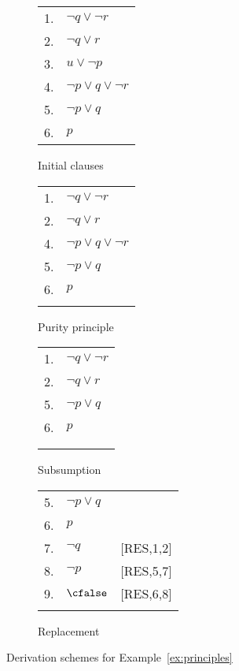 \begin{example}
    \begin{figure}
        \centering
       \begin{subfigure}{.20\textwidth}
           \caption{Initial clauses}
           \begin{tabular}{rl}
               1. & $\neg q \lor \neg r$ \\
               2. & $\neg q \lor r$ \\
               3. & $u \lor \neg p$ \\
               4. & $\neg p \lor q \lor \neg r$ \\
               5. & $\neg p \lor q$ \\
               6. & $p$
           \end{tabular}%
           \label{tab:resa}
       \end{subfigure} 
       \begin{subfigure}{.21\textwidth}
           \caption{Purity principle}
           \begin{tabular}{rl}
               1. & $\neg q \lor \neg r$ \\
               2. & $\neg q \lor r$ \\
               4. & $\neg p \lor q \lor \neg r$ \\
               5. & $\neg p \lor q$ \\
               6. & $p$ \\
                  & 
           \end{tabular}%
           \label{tab:resb}
       \end{subfigure} 
       \begin{subfigure}{.19\textwidth}
           \caption{Subsumption}
           \begin{tabular}{rl}
               1. & $\neg q \lor \neg r$ \\
               2. & $\neg q \lor r$ \\
               5. & $\neg p \lor q$ \\
               6. & $p$ \\
                  & \\
                  &
           \end{tabular}%
           \label{tab:resc}
       \end{subfigure} 
       \begin{subfigure}{.24\textwidth}
           \caption{Replacement}
           \begin{tabular}{rll}
               5. & $\neg p \lor q$ \\
               6. & $p$ \\
               7. & $\neg q$ & [RES,1,2] \\
               8. & $\neg p$ & [RES,5,7] \\
               9.& $\cfalse$ & [RES,6,8] \\
                  &
           \end{tabular}%
           \label{tab:resd}
       \end{subfigure} 
        \caption{Derivation schemes for Example~\ref{ex:principles}}
    \end{figure}%
\label{ex:principles}
\end{example}

